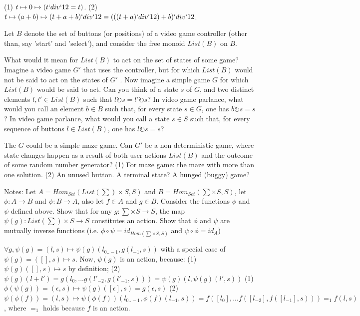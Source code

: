 \documentclass{article}
\begin{document}
\ei (1) $t \mapsto 0 \mapsto (t `div` 12 = t)$. (2) $t \mapsto (a + b) \mapsto
    (t + a + b)`div` 12 = (((t + a)`div` 12) + b) `div` 12$.
\ee


Let $B$ denote the set of buttons (or positions) of a video game controller
(other than, say 'start' and 'select'), and consider the free monoid $List(B)$
on $B$.

\es What would it mean for $List(B)$ to act on the set of states of some game?
    Imagine a video game $G'$ that uses the controller, but for which $List(B)$
    would not be said to act on the states of $G'$ . Now imagine a simple game
    $G$ for which $List(B)$ would be said to act.
\ei Can you think of a state $s$ of $G$, and two distinct elements $l, l' \in
    List(B)$ such that $l \circlearrowright s = l' \circlearrowright s$?  In
    video game parlance, what would you call an element $b \in B$ such that, for
    every state $s \in G$, one has $b \circlearrowright s = s$?
\ei In video game parlance, what would you call a state $s \in S$ such that, for
    every sequence of buttons $l \in List(B)$, one has $l \circlearrowright s =
    s$?
\ee


\ans

\es The $G$ could be a simple maze game. Can $G'$ be a non-deterministic game,
    where state changes happen as a result of both user actions $List(B)$ and
    the outcome of some random number generator?
\ei (1) For maze game: the maze with more than one solution. (2) An unused
    button.
\ei A terminal state? A hunged (buggy) game?
\ee


Notes: Let $A = Hom_{Set}(List(\sum) \times S, S)$ and $B = Hom_{Set}(\sum
\times S, S)$, let $\phi: A \to B$ and $\psi: B \to A$, also let $f \in A$ and
$g \in B$.
\vsp
Consider the functions $\phi$ and $\psi$ defined above.
\es Show that for any $g : \sum \times S \to S$, the map $\psi(g) : List(\sum)
    \times S \to S$ constitutes an action.
\ei Show that $\phi$ and $\psi$ are mutually inverse functions (i.e. $\phi \circ \psi =
    id_{Hom(\sum \times S,S)}$ and $\psi \circ \phi = id_{A}$)
\ee

\ans

\es $\forall g, \psi(g) = (l,s) \mapsto \psi(g)(l_{0..-1}, g(l_{-1},s))$ with a
    special case of $\psi(g) = ([],s) \mapsto s$. Now, $\psi(g)$ is an
    action, because: (1) $\psi(g)([],s) \mapsto s$ by definition; (2)
    $\psi(g)(l + l') = g(l_0, ... g(l'_{-2}, g(l'_{-1}, s))) = \psi(g)(l,
    \psi(g)(l', s))$
\ei (1) $\phi(\psi(g)) = (\epsilon, s) \mapsto \psi(g)([\epsilon], s) = g(\epsilon, s)$
    (2) $\psi(\phi(f)) = (l,s) \mapsto \psi(\phi(f))(l_{0..-1}, \phi(f)(l_{-1},
    s)) = f([l_0], ... f([l_{-2}], f([l_{-1}], s))) =_1 f(l,s)$, where $=_1$
    holds because $f$ is an action.
\ee
\end{document}
